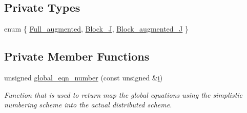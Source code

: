 \subsection*{Private Types}
\begin{DoxyCompactItemize}
\item 
enum \{ \hyperlink{classoomph_1_1PitchForkHandler_a51e85b70ec1c902015024b18bdb3dacba0e7d0b0eb06a1f2d90a3ab2831bec36d}{Full\+\_\+augmented}, 
\hyperlink{classoomph_1_1PitchForkHandler_a51e85b70ec1c902015024b18bdb3dacbae729c94eb567cd88e0b33dc29d9f8d5d}{Block\+\_\+J}, 
\hyperlink{classoomph_1_1PitchForkHandler_a51e85b70ec1c902015024b18bdb3dacbac8e196e66210e158988de0bfebcdf6a5}{Block\+\_\+augmented\+\_\+J}
 \}
\end{DoxyCompactItemize}
\subsection*{Private Member Functions}
\begin{DoxyCompactItemize}
\item 
unsigned \hyperlink{classoomph_1_1PitchForkHandler_ac1a4bbb1415a009e9f176f16263fcb3e}{global\+\_\+eqn\+\_\+number} (const unsigned \&\hyperlink{cfortran_8h_adb50e893b86b3e55e751a42eab3cba82}{i})
\begin{DoxyCompactList}\small\item\em Function that is used to return map the global equations using the simplistic numbering scheme into the actual distributed scheme. \end{DoxyCompactList}\end{DoxyCompactItemize}

